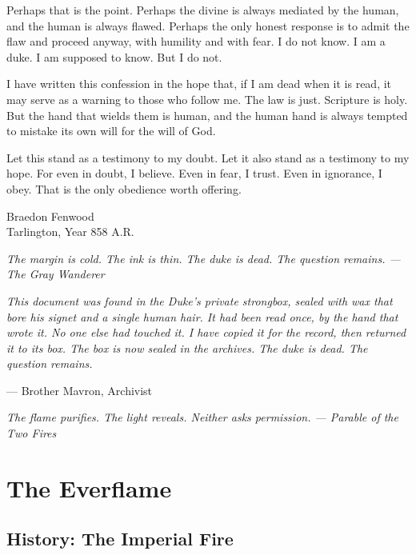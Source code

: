 \documentclass{book}
\newcommand{\citation}[1]{\textcolor{marginalia}{\small\textit{#1}}}
\begin{document}
Perhaps that is the point. Perhaps the divine is always mediated by the human, and the human is always flawed. Perhaps the only honest response is to admit the flaw and proceed anyway, with humility and with fear. I do not know. I am a duke. I am supposed to know. But I do not.

I have written this confession in the hope that, if I am dead when it is read, it may serve as a warning to those who follow me. The law is just. Scripture is holy. But the hand that wields them is human, and the human hand is always tempted to mistake its own will for the will of God.

Let this stand as a testimony to my doubt. Let it also stand as a testimony to my hope. For even in doubt, I believe. Even in fear, I trust. Even in ignorance, I obey. That is the only obedience worth offering.

\vspace{1em}

\noindent Braedon Fenwood\\
Tarlington, Year 858 A.R.

\vspace{1em}

\noindent \citation{The margin is cold. The ink is thin. The duke is dead. The question remains. --- The Gray Wanderer}

\vspace{1em}

\noindent \textit{This document was found in the Duke's private strongbox, sealed with wax that bore his signet and a single human hair. It had been read once, by the hand that wrote it. No one else had touched it. I have copied it for the record, then returned it to its box. The box is now sealed in the archives. The duke is dead. The question remains.}

\vspace{1em}

\noindent --- Brother Mavron, Archivist

\citation{The flame purifies. The light reveals. Neither asks permission. --- Parable of the Two Fires}

\part{The Everflame}

\chapter{History: The Imperial Fire}
\end{document}
